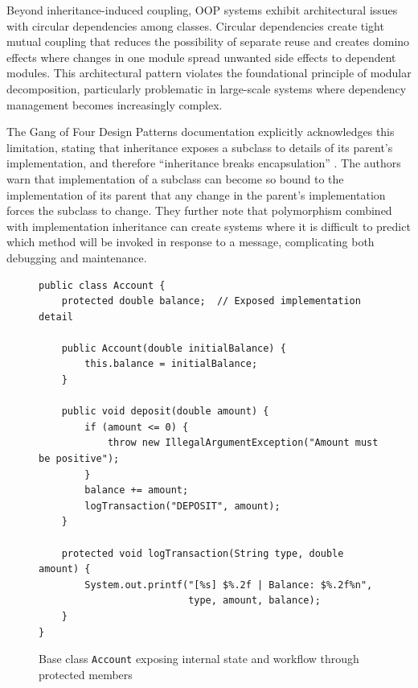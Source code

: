 Beyond inheritance-induced coupling, OOP systems exhibit architectural issues with circular dependencies among classes. Circular dependencies create tight mutual coupling that reduces the possibility of separate reuse and creates domino effects where changes in one module spread unwanted side effects to dependent modules. This architectural pattern violates the foundational principle of modular decomposition, particularly problematic in large-scale systems where dependency management becomes increasingly complex.

The Gang of Four Design Patterns documentation explicitly acknowledges this limitation, stating that inheritance exposes a subclass to details of its parent's implementation, and therefore ``inheritance breaks encapsulation'' \cite{gamma1995design}. The authors warn that implementation of a subclass can become so bound to the implementation of its parent that any change in the parent's implementation forces the subclass to change. They further note that polymorphism combined with implementation inheritance can create systems where it is difficult to predict which method will be invoked in response to a message, complicating both debugging and maintenance.

\begin{figure}[htbp]
    \centering
    \begin{verbatim}
public class Account {
    protected double balance;  // Exposed implementation detail
    
    public Account(double initialBalance) {
        this.balance = initialBalance;
    }
    
    public void deposit(double amount) {
        if (amount <= 0) {
            throw new IllegalArgumentException("Amount must be positive");
        }
        balance += amount;
        logTransaction("DEPOSIT", amount); 
    }
    
    protected void logTransaction(String type, double amount) {
        System.out.printf("[%s] $%.2f | Balance: $%.2f%n", 
                          type, amount, balance);
    }
}
    \end{verbatim}
    \caption{Base class \texttt{Account} exposing internal state and workflow through protected members}
    \label{fig:account-base}
\end{figure}

